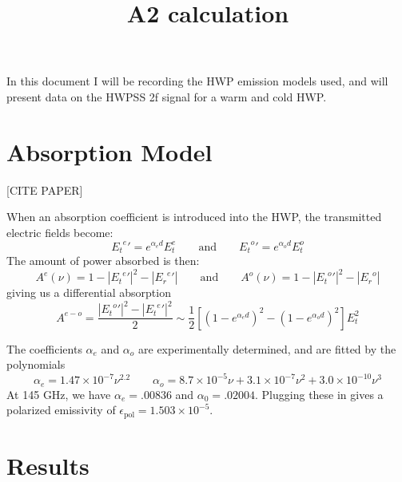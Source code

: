 \documentclass{article}
\title{A2 calculation}
\author{}
\theoremstyle{remark}
\renewcommand{\t}[1]{\text{#1}}
\newcommand{\abs}[1]{\left|#1\right|}%
\begin{document}
\maketitle

In this document I will be recording the HWP emission models used, and will present data on the HWPSS 2f signal for a warm and cold HWP.

\section{Absorption Model}
[CITE PAPER]

When an absorption coefficient is introduced into the HWP, the transmitted electric fields become:
\[
{{E_t}^e}' = e^{\alpha_e d} E_{t}^{e}  \qquad \t{and} \qquad{{E_t}^o}' = e^{\alpha_o d} E_t^o
\]
The amount of power absorbed is then:
\[A^e(\nu) = 1 - \abs{{{E_t}^e}'}^2 - \abs{{{E_r}^e}'} \qquad \t{and} \qquad 
A^o(\nu) = 1 - \abs{{{E_t}^o}'}^2 - \abs{{{E_r}^o}}
\]
giving us a differential absorption
\[
A^{e-o} = \frac{ \abs{{{E_t}^o}'}^2 -  \abs{{{E_t}^e}'}^2}{2}
\sim
\frac{1}{2}\left[(1 - e^{\alpha_e d})^2 - (1 - e^{\alpha_o d})^2\right] E_t^2
\]

The coefficients $\alpha_e$ and $\alpha_o$ are experimentally determined, and are fitted by the polynomials
\[
\alpha_e = 1.47\times 10^{-7} \nu^{2.2}
\qquad
\alpha_o = 8.7\times 10^{-5} \nu + 3.1 \times 10^{-7} \nu^2 + 3.0 \times 10^{-10} \nu^3
\]
At 145 GHz, we have $\alpha_e = .00836$ and $\alpha_0 = .02004$.
Plugging these in gives a polarized emissivity of $\epsilon_\t{pol} = 1.503 \times 10^{-5}$.

\section{Results}




\printbibliography
\end{document}
